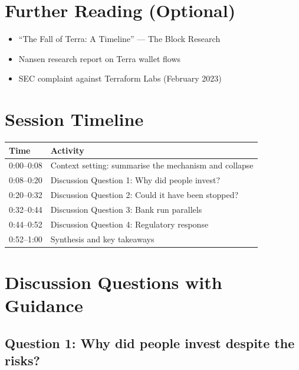 \documentclass[11pt]{article}
\begin{document}
\section*{Further Reading (Optional)}

\begin{itemize}[leftmargin=*]
\item ``The Fall of Terra: A Timeline'' --- The Block Research
\item Nansen research report on Terra wallet flows
\item SEC complaint against Terraform Labs (February 2023)
\end{itemize}

\newpage


\section*{Session Timeline}

\begin{center}
\begin{tabular}{ll}
\toprule
\textbf{Time} & \textbf{Activity} \\
\midrule
0:00--0:08 & Context setting: summarise the mechanism and collapse \\
0:08--0:20 & Discussion Question 1: Why did people invest? \\
0:20--0:32 & Discussion Question 2: Could it have been stopped? \\
0:32--0:44 & Discussion Question 3: Bank run parallels \\
0:44--0:52 & Discussion Question 4: Regulatory response \\
0:52--1:00 & Synthesis and key takeaways \\
\bottomrule
\end{tabular}
\end{center}

\section*{Discussion Questions with Guidance}

\subsection*{Question 1: Why did people invest despite the risks?}
\end{document}
